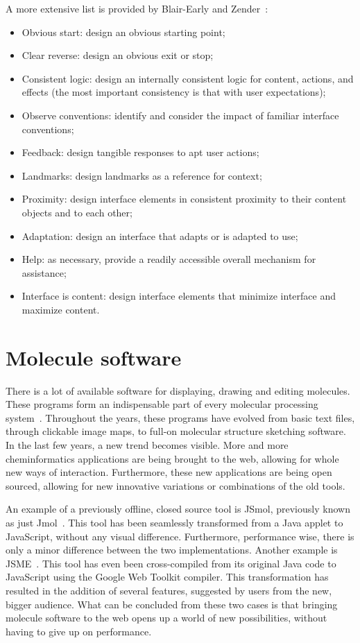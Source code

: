 A more extensive list is provided by Blair-Early and Zender~\cite{blair2008user}:
\begin{itemize}[noitemsep,topsep=0pt,parsep=0pt,partopsep=0pt]
\item Obvious start: design an obvious starting point;
\item Clear reverse: design an obvious exit or stop;
\item Consistent logic: design an internally consistent logic for content, actions, and effects (the most important consistency is that with user expectations);
\item Observe conventions: identify and consider the impact of familiar interface conventions;
\item Feedback: design tangible responses to apt user actions;
\item Landmarks: design landmarks as a reference for context;
\item Proximity: design interface elements in consistent proximity to their content objects and to each other;
\item Adaptation: design an interface that adapts or is adapted to use;
\item Help: as necessary, provide a readily accessible overall mechanism for assistance;
\item Interface is content: design interface elements that minimize interface and maximize content.
\end{itemize}


\section{Molecule software}

There is a lot of available software for displaying, drawing and editing molecules. These programs form an indispensable part of every molecular processing system~\cite{ertl2010molecular}. Throughout the years, these programs have evolved from basic text files, through clickable image maps, to full-on molecular structure sketching software. In the last few years, a new trend becomes visible. More and more cheminformatics applications are being brought to the web, allowing for whole new ways of interaction. Furthermore, these new applications are being open sourced, allowing for new innovative variations or combinations of the old tools.

An example of a previously offline, closed source tool is JSmol, previously known as just Jmol~\cite{hanson2013jsmol}. This tool has been seamlessly transformed from a Java applet to JavaScript, without any visual difference. Furthermore, performance wise, there is only a minor difference between the two implementations. Another example is JSME~\cite{bienfait2013jsme}. This tool has even been cross-compiled from its original Java code to JavaScript using the Google Web Toolkit compiler. This transformation has resulted in the addition of several features, suggested by users from the new, bigger audience. What can be concluded from these two cases is that bringing molecule software to the web opens up a world of new possibilities, without having to give up on performance.

